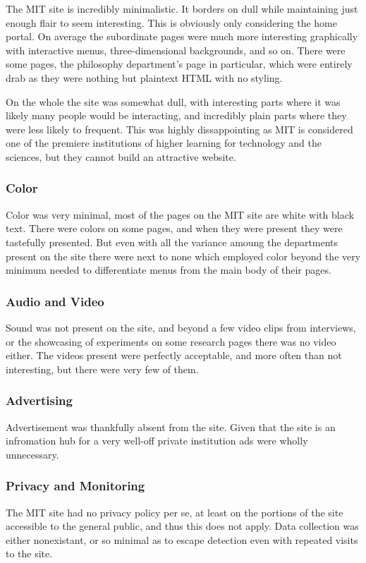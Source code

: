 The MIT site is incredibly minimalistic. It borders on dull while maintaining just enough flair
to seem interesting. This is obviously only considering the home portal. On average the
subordinate pages were much more interesting graphically with interactive menus,
three-dimensional backgrounds, and so on. There were some pages, the philosophy department's
page in particular, which were entirely drab as they were nothing but plaintext HTML with no
styling.

On the whole the site was somewhat dull, with interesting parts where it was likely many
people would be interacting, and incredibly plain parts where they were less likely to
frequent. This was highly dissappointing as MIT is considered one of the premiere
institutions of higher learning for technology and the sciences, but they cannot build an
attractive website.

\subsubsection*{Color}

Color was very minimal, most of the pages on the MIT site are white with black text. There
were colors on some pages, and when they were present they were tastefully presented. But
even with all the variance amoung the departments present on the site there were next to none
which employed color beyond the very minimum needed to differentiate menus from the main
body of their pages.

\subsubsection*{Audio and Video}

Sound was not present on the site, and beyond a few video clips from interviews, or the
showcasing of experiments on some research pages there was no video either. The videos
present were perfectly acceptable, and more often than not interesting, but there were very
few of them.

\subsubsection*{Advertising}

Advertisement was thankfully absent from the site. Given that the site is an infromation hub
for a very well-off private institution ads were wholly unnecessary.

\subsubsection*{Privacy and Monitoring}

The MIT site had no privacy policy per se, at least on the portions of the site accessible to the
general public, and thus this does not apply. Data collection was either nonexistant, or so
minimal as to escape detection even with repeated visits to the site.
